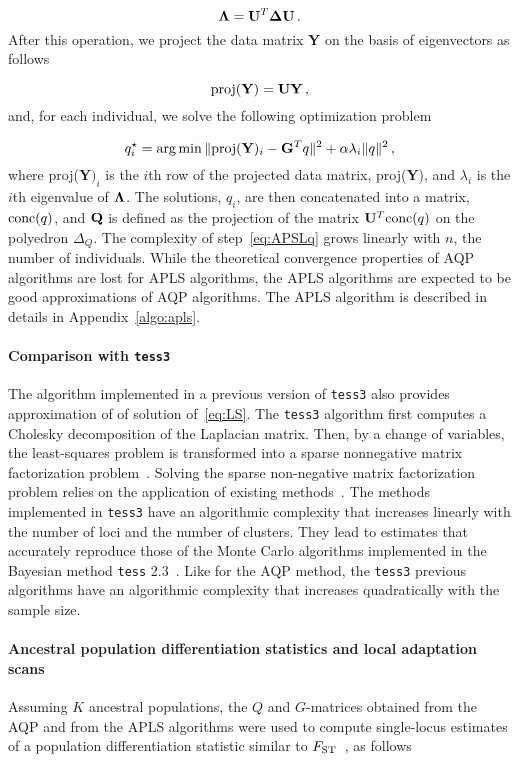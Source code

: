 $$
{\bf \Lambda} = {\bf U}^T {\bf \Delta} {\bf U} \, .
$$
\noindent  After this operation, we project the data matrix {\bf Y} on the basis of eigenvectors as follows

$$
{\rm proj} ({\bf Y}) = {\bf U}{\bf Y} \, , 
$$
\noindent and, for each individual, we solve the following optimization problem

\begin{equation}
q_i^\star = \arg \min  \|  {\rm proj} ({\bf Y})_i  - {\bf G}^Tq \|^2 + \alpha \lambda_i \| q \|^2  \, ,
\label{eq:APSLq}
\end{equation}
\noindent where  proj({\bf Y}$)_i$ is the $i$th row of the projected data matrix, proj({\bf Y}), and $\lambda_i$ is the $i$th eigenvalue of ${\bf \Lambda}$. The solutions, $q_i$, are then concatenated into a matrix, ${\rm conc}(q)$, and ${\bf Q}$ is defined as the projection of the matrix ${\bf U}^T {\rm conc}(q)$ on the polyedron $\Delta_Q$. The complexity of step~\eqref{eq:APSLq} grows linearly with $n$, the number of individuals. While the theoretical convergence properties of AQP algorithms are lost for APLS algorithms, the APLS algorithms are expected to be good approximations of AQP algorithms. The APLS algorithm is described in details in Appendix~\ref{algo:apls}.

\paragraph{Comparison with {\tt tess3}}  The algorithm implemented in a previous version of {\tt tess3} also provides approximation of of solution of~\eqref{eq:LS}. The {\tt tess3} algorithm first computes a Cholesky decomposition of the Laplacian matrix. Then, by a change of variables, the least-squares problem is transformed into a sparse nonnegative matrix factorization problem~\citep{Caye2016}.  Solving the sparse non-negative matrix factorization problem relies on the application of existing methods~\citep{Kim2011, Frichot2014}. The methods implemented in {\tt tess3} have an algorithmic complexity that increases linearly with the number of loci and the number of clusters. They lead to estimates that accurately reproduce those of the Monte Carlo algorithms implemented in the Bayesian method {\tt tess} 2.3~\citep{Caye2016}. Like for the AQP method, the {\tt tess3} previous algorithms have an algorithmic complexity that increases quadratically with the sample size. 




\paragraph{Ancestral population differentiation statistics and local adaptation scans} Assuming $K$ ancestral populations, the $Q$ and $G$-matrices  obtained from the AQP and from the APLS algorithms were used to compute single-locus estimates of a population differentiation statistic similar to $F_{\rm ST}$~\citep{Martins2016}, as follows


